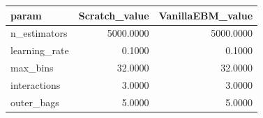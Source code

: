 \begin{tabular}{lrr}
\toprule
param & Scratch_value & VanillaEBM_value \\
\midrule
n_estimators & 5000.0000 & 5000.0000 \\
learning_rate & 0.1000 & 0.1000 \\
max_bins & 32.0000 & 32.0000 \\
interactions & 3.0000 & 3.0000 \\
outer_bags & 5.0000 & 5.0000 \\
\bottomrule
\end{tabular}
